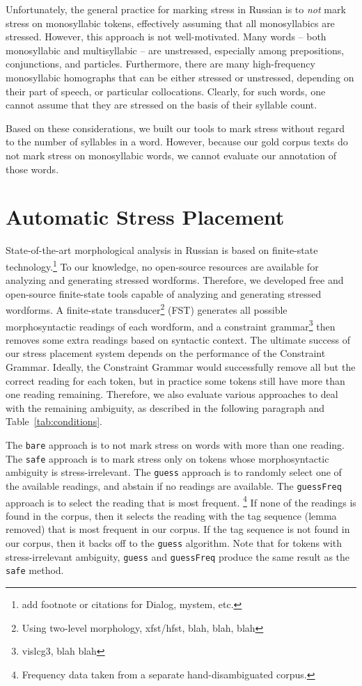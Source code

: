 \documentclass[11pt]{article}
\newcommand{\rus}[1]{\foreignlanguage{russian}{#1}}
\newcommand{\rr}[1]{\marginpar{\scriptsize R: #1}} %
\begin{document}
Unfortunately, the general practice for marking stress in Russian is to
\emph{not} mark stress on monosyllabic tokens, effectively assuming that
all monosyllabics are stressed. However, this approach 
is not well-motivated. Many words -- both monosyllabic and multisyllabic -- are 
unstressed, especially among prepositions, conjunctions, and particles.
\rr{multisyllabics that can be unstressed: \rus{через, между}} Furthermore, there are many
high-frequency monosyllabic homographs that can be either stressed or unstressed, 
depending on their part of speech, or particular collocations. Clearly, for
such words, one cannot assume that they are stressed on the basis of their syllable count.

Based on these considerations, we built our tools to mark stress without regard to
the number of syllables in a word. However, because our gold corpus texts do not
mark stress on monosyllabic words, we cannot evaluate our annotation of those words.

\section{Automatic Stress Placement}

State-of-the-art morphological analysis in Russian is based on finite-state
technology.\footnote{add footnote or citations for Dialog, mystem, etc.} To our knowledge,
no open-source resources are available for analyzing and generating stressed wordforms.
Therefore, we developed free and open-source finite-state tools capable of analyzing and
generating stressed wordforms. A finite-state transducer\footnote{Using two-level 
morphology, xfst/hfst, blah, blah, blah} (FST) generates all possible morphosyntactic readings
of each wordform, and a constraint grammar\footnote{vislcg3, blah blah} then removes
some extra readings based on syntactic context. The ultimate success of our stress placement
system depends on the performance of the Constraint Grammar. Ideally, the Constraint Grammar would
successfully remove all but the correct reading for each token, but in practice some
tokens still have more than one reading remaining. Therefore,
we also evaluate various approaches to deal with the remaining ambiguity,
as described in the following paragraph and Table~\ref{tab:conditions}.

The {\small {\tt bare}} approach is to not mark stress on words with more than one reading.
The {\small {\tt safe}} approach is to mark stress only on
tokens whose morphosyntactic ambiguity is stress-irrelevant. The {\small {\tt guess}}
approach is to randomly select one of the available readings, and abstain if no readings
are available. The {\small {\tt guessFreq}} approach is to select the reading that is most frequent.
\footnote{Frequency data taken from a separate hand-disambiguated corpus.} If none of the readings is found in the corpus, then it selects the reading
with the tag sequence (lemma removed) that is most frequent in our corpus. If the tag sequence is not found
in our corpus, then it backs off to the  {\small {\tt guess}} algorithm. Note that for tokens with
stress-irrelevant ambiguity, {\small {\tt guess}} and {\small {\tt guessFreq}} produce
the same result as the {\small {\tt safe}} method.
\end{document}
